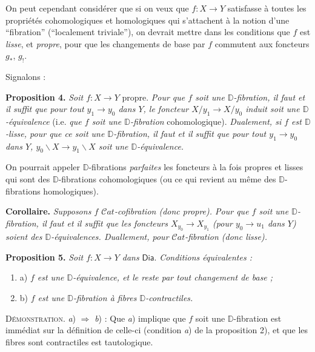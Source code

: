 \documentclass[11pt]{article}
\newcommand{\printedpage}[1]{\marginpar{\footnotesize p.~#1}}
\newcommand{\msp}[1]{\marginpar{\footnotesize [#1]}}
\newcommand{\DD}{\mathbb{D}}
\newcommand{\Cat}{\mathcal{C}at}
\newcommand{\Dia}{\mathsf{Dia}}
\begin{document}
\indent On peut cependant considérer que si on veux que $f : X \to Y$ satisfasse à toutes les propriétés cohomologiques et homologiques qui s'attachent à la notion d'une “fibration” (“localement triviale”), on devrait mettre dans les conditions que $f$ est \textit{lisse}, et \textit{propre}, pour que les changements de base par $f$ commutent aux foncteurs $g_*$, $g_!$. %

\printedpage{51}

\msp{page 83}

Signalons :

\textbf{Proposition 4.} \textit{Soit $f : X \to Y$} propre. \textit{Pour que $f$ soit une $\DD$-fibration, il faut et il suffit que pour tout $y_1 \to y_0$ dans $Y$, le foncteur $X/y_1 \to X/y_0$ induit soit une $\DD$-équivalence} (i.e. \textit{que $f$ soit une $\DD$-fibration} cohomologique). \textit{Dualement, si $f$ est $\DD$-lisse, pour que ce soit une $\DD$-fibration, il faut et il suffit que pour tout $y_1 \to y_0$ dans $Y$, $y_0\backslash X \to y_1\backslash X$ soit une $\DD$-équivalence.}

\indent On pourrait appeler $\DD$-fibrations \textit{parfaites} les foncteurs à la fois propres et lisses qui sont des $\DD$-fibrations cohomologiques (ou ce qui revient au même des $\DD$-fibrations homologiques).

\textbf{Corollaire.} \textit{Supposons $f$ $\Cat$-cofibration (donc propre). Pour que $f$ soit une $\DD$-fibration, il faut et il suffit que les foncteurs $X_{y_0} \to X_{y_1}$ (pour $y_0 \to u_1$ dans $Y$) soient des $\DD$-équivalences. Duallement, pour $\Cat$-fibration (donc lisse).} %

\textbf{Proposition 5.} \textit{Soit $f : X \to Y$ dans} $\Dia$. \textit{Conditions équivalentes :}
\begin{enumerate}[label={}, leftmargin=2em, labelsep=0pt]
\item a) \textit{$f$ est une $\DD$-équivalence, et le reste par tout changement de base ;}
\item b) \textit{$f$ est une $\DD$-fibration à fibres $\DD$-contractiles.}
\end{enumerate}

\textsc{Démonstration.} \textit{a}) $\Rightarrow$ \textit{b}) : Que \textit{a}) implique que $f$ soit une $\DD$-fibration est immédiat sur la définition de celle-ci (condition \textit{a}) de la proposition 2), et que les fibres sont contractiles est tautologique.
\end{document}
